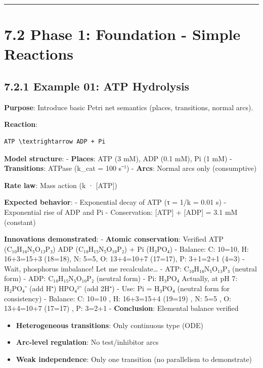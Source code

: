 \begin{center}\rule{0.5\linewidth}{0.5pt}\end{center}

\hypertarget{phase-1-foundation---simple-reactions}{%
\section{7.2 Phase 1: Foundation - Simple
Reactions}\label{phase-1-foundation---simple-reactions}}

\hypertarget{example-01-atp-hydrolysis}{%
\subsection{7.2.1 Example 01: ATP
Hydrolysis}\label{example-01-atp-hydrolysis}}

\textbf{Purpose}: Introduce basic Petri net semantics (places,
transitions, normal arcs).

\textbf{Reaction}:

\begin{lstlisting}
ATP \textrightarrow ADP + Pi
\end{lstlisting}

\textbf{Model structure}: - \textbf{Places}: ATP (3 mM), ADP (0.1 mM),
Pi (1 mM) - \textbf{Transitions}: ATPase (k\_cat = 100 s⁻¹) -
\textbf{Arcs}: Normal arcs only (consumptive)

\textbf{Rate law}: Mass action (k · {[}ATP{]})

\textbf{Expected behavior}: - Exponential decay of ATP (τ = 1/k = 0.01
s) - Exponential rise of ADP and Pi - Conservation: {[}ATP{]} +
{[}ADP{]} = 3.1 mM (constant)

\textbf{Innovations demonstrated}: - \checkmark \textbf{Atomic conservation}:
Verified ATP (C₁₀H₁₆N₅O₁₃P₃) \textrightarrow ADP (C₁₀H₁₅N₅O₁₀P₂) + Pi (H₃PO₄) -
Balance: C: 10=10, H: 16+3=15+3 (18=18), N: 5=5, O: 13+4=10+7 (17=17),
P: 3+1=2+1 (4=3) - Wait, phosphorus imbalance! Let me
recalculate\ldots{} - ATP: C₁₀H₁₆N₅O₁₃P₃ (neutral form) - ADP:
C₁₀H₁₅N₅O₁₀P₂ (neutral form) - Pi: H₃PO₄ \textrightarrow Actually, at pH 7: H₂PO₄⁻
(add H⁺) \textrightarrow HPO₄²⁻ (add 2H⁺) - Use: Pi = H₃PO₄ (neutral form for
consistency) - Balance: C: 10=10 \checkmark, H: 16+3=15+4 (19=19) \checkmark, N: 5=5 \checkmark, O:
13+4=10+7 (17=17) \checkmark, P: 3=2+1 \checkmark - \textbf{Conclusion}: Elemental balance
verified

\begin{itemize}
\tightlist
\item
  \textwarning \textbf{Heterogeneous transitions}: Only continuous type (ODE)
\item
  \textwarning \textbf{Arc-level regulation}: No test/inhibitor arcs
\item
  \textwarning \textbf{Weak independence}: Only one transition (no parallelism to
  demonstrate)
\end{itemize}


